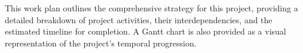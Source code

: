 \documentclass[a4paper, 12pt]{extreport}
\begin{document}
		
		This work plan outlines the comprehensive strategy for this project, providing a detailed breakdown of project activities, their interdependencies, and the estimated timeline for completion. A Gantt chart is also provided as a visual representation of the project's temporal progression.
		
\end{document}
